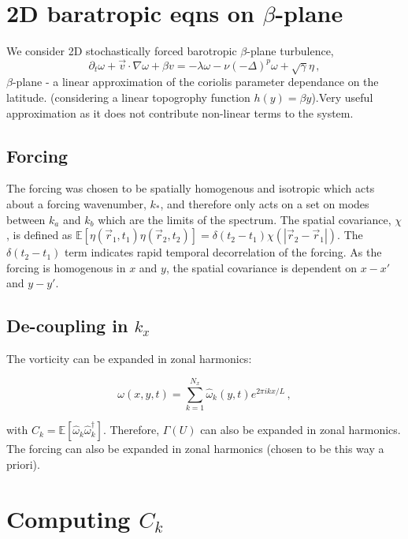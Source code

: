 \documentclass[12pt]{amsart}
\def\EE{\mathbb{E}}\def\PP{\mathbb{P}}
\begin{document}
\section{2D baratropic eqns on $\beta$-plane}

We consider 2D stochastically forced barotropic $\beta$-plane
turbulence,
\begin{equation}
  \label{eq:qg}
  \partial_t \omega + \vec{v}\cdot \nabla \omega + \beta v =
  -\lambda\omega - \nu (-\Delta)^p \omega + \sqrt{\gamma}\eta\,,
\end{equation}
 $\beta$-plane - a linear approximation of the coriolis parameter dependance on the latitude. (considering a linear topogrophy function $h(y) = \beta y$).Very useful approximation as it does not contribute non-linear terms to the system.
 
\subsection{Forcing}
 
The forcing was chosen to be spatially homogenous and isotropic which acts about a forcing wavenumber, $k_{*}$, and therefore only acts on a set on modes between $k_{a}$ and $k_{b}$ which are the limits of the spectrum. The spatial covariance, $\chi$, is defined as $\EE\left[\eta(\vec r_1, t_1)\eta(\vec
  r_2,t_2)\right]=\delta(t_2-t_1) \chi(|\vec r_2- \vec r_1|)$. The $\delta(t_2-t_1)$ term indicates rapid temporal decorrelation of the forcing. As the forcing is homogenous in $x$ and $y$, the spatial covariance is dependent on $x - x'$ and $y - y'$.
  
\subsection{De-coupling in $k_{x}$}

The vorticity can be expanded in zonal harmonics:

\begin{equation*}
  \omega(x,y,t) = \sum_{k=1}^{N_x} \hat\omega_k(y,t) e^{2\pi i k x/L}\,,
\end{equation*}
 
with $C_{k} = \EE[\hat\omega_k \hat\omega_k ^\dagger]$. Therefore, $\Gamma(U)$ can also be expanded in zonal harmonics. The forcing can also be expanded in zonal harmonics (chosen to be this way a priori).


\section{Computing $C_{k}$}
\end{document}
